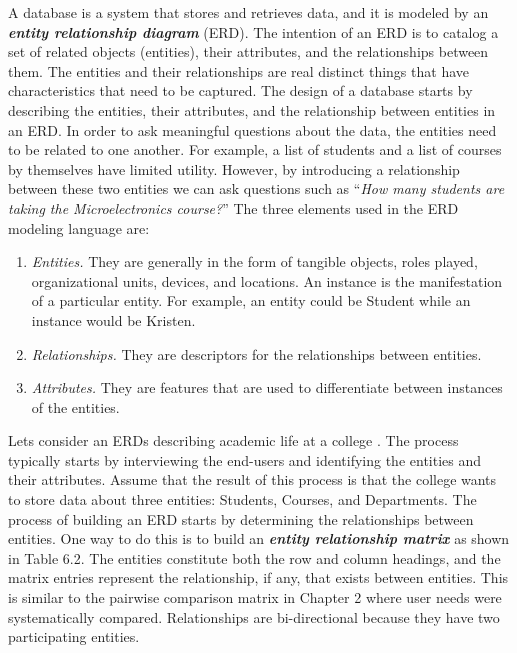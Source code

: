 A database is a system that stores and retrieves data, and it is modeled
by an \emph{\textbf{entity relationship diagram}} (ERD). The intention
of an ERD is to catalog a set of related objects (entities), their
attributes, and the relationships between them. The entities and their
relationships are real distinct things that have characteristics that
need to be captured. The design of a database starts by describing the
entities, their attributes, and the relationship between entities in an
ERD. In order to ask meaningful questions about the data, the entities
need to be related to one another. For example, a list of students and a
list of courses by themselves have limited utility. However, by
introducing a relationship between these two entities we can ask
questions such as ``\emph{How many students are taking the
Microelectronics course?}'' The three elements used in the ERD modeling
language are:

\begin{enumerate}
\def\labelenumi{\arabic{enumi}.}
\item
  \emph{Entities.} They are generally in the form of tangible objects,
  roles played, organizational units, devices, and locations. An
  instance is the manifestation of a particular entity. For example, an
  entity could be Student while an instance would be Kristen.
\item
  \emph{Relationships.} They are descriptors for the relationships
  between entities.
\item
  \emph{Attributes.} They are features that are used to differentiate
  between instances of the entities.
\end{enumerate}

Lets consider an ERDs describing academic life at a college . The
process typically starts by interviewing the end-users and identifying
the entities and their attributes. Assume that the result of this
process is that the college wants to store data about three entities:
Students, Courses, and Departments. The process of building an ERD
starts by determining the relationships between entities. One way to do
this is to build an \emph{\textbf{entity relationship matrix}} as shown
in Table 6.2. The entities constitute both the row and column headings,
and the matrix entries represent the relationship, if any, that exists
between entities. This is similar to the pairwise comparison matrix in
Chapter 2 where user needs were systematically compared. Relationships
are bi-directional because they have two participating entities.

